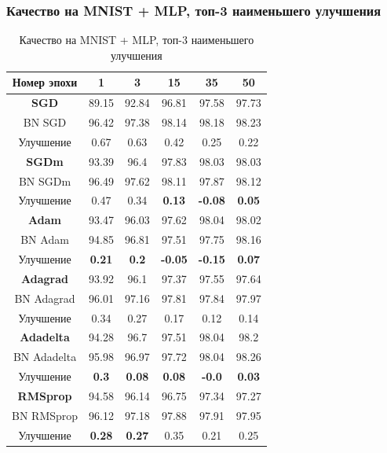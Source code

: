 \documentclass{beamer}
\begin{document}
\begin{frame}
	\frametitle{\footnotesize Качество на MNIST + MLP, топ-3 наименьшего улучшения}
\begin{table}
\centering
\scriptsize
\begin{tabular}{|c|c|c|c|c|c|}\hline
Номер эпохи & 1 & 3 & 15 & 35 & 50 \\\hline\hline
\textbf{SGD} & 89.15 & 92.84 & 96.81 & 97.58 & 97.73 \\\hline
BN SGD & 96.42 & 97.38 & 98.14 & 98.18 & 98.23 \\\hline
{Улучшение} & 0.67 & 0.63 & 0.42 & 0.25 & 0.22 \\\hline\hline
\color{red}\textbf{SGDm} & 93.39 & 96.4 & 97.83 & 98.03 & 98.03 \\\hline
BN SGDm & 96.49 & 97.62 & 98.11 & 97.87 & 98.12 \\\hline
{Улучшение} & 0.47 & 0.34 & \color{red} \textbf{0.13} & \color{red} \textbf{-0.08} & \color{red} \textbf{0.05} \\\hline\hline
\color{red}\textbf{Adam} & 93.47 & 96.03 & 97.62 & 98.04 & 98.02 \\\hline
BN Adam & 94.85 & 96.81 & 97.51 & 97.75 & 98.16 \\\hline
{Улучшение} & \color{red} \textbf{0.21} & \color{red} \textbf{0.2} & \color{red}\textbf{-0.05} & \color{red}\textbf{-0.15} & \color{red}\textbf{0.07} \\\hline\hline
\textbf{Adagrad} & 93.92 & 96.1 & 97.37 & 97.55 & 97.64 \\\hline
BN Adagrad & 96.01 & 97.16 & 97.81 & 97.84 & 97.97 \\\hline
{Улучшение} & 0.34 & 0.27 & 0.17 & 0.12 & 0.14 \\\hline\hline
\color{red}\textbf{Adadelta} & 94.28 & 96.7 & 97.51 & 98.04 & 98.2 \\\hline
BN Adadelta & 95.98 & 96.97 & 97.72 & 98.04 & 98.26 \\\hline
{Улучшение} & \color{red}\textbf{0.3} & \color{red}\textbf{0.08} & \color{red}\textbf{0.08} & \color{red}\textbf{-0.0} & \color{red}\textbf{0.03} \\\hline\hline
\textbf{RMSprop} & 94.58 & 96.14 & 96.75 & 97.34 & 97.27 \\\hline
BN RMSprop & 96.12 & 97.18 & 97.88 & 97.91 & 97.95 \\\hline
{Улучшение} & \color{red}\textbf{0.28} & \color{red}\textbf{0.27} & 0.35 & 0.21 & 0.25 \\\hline
\end{tabular}
\caption{\scriptsize Качество на MNIST + MLP, топ-3 наименьшего улучшения}
\end{table}
\end{frame}
\end{document}
